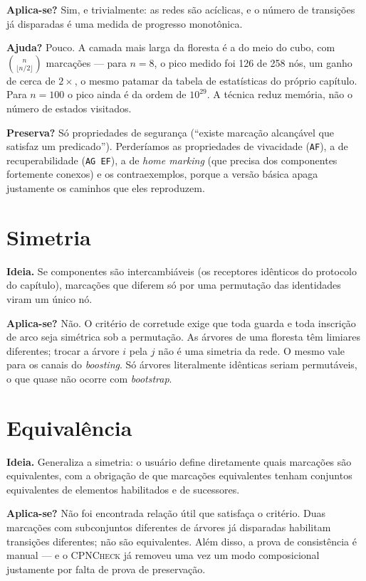 \documentclass[11pt,a4paper]{report}
\newcommand{\cpn}{\textsc{CPNCheck}}
\newcommand{\code}[1]{\texttt{\small #1}}
\theoremstyle{definition}
\begin{document}
\textbf{Aplica-se?} Sim, e trivialmente: as redes são acíclicas, e o número de
transições já disparadas é uma medida de progresso monotônica.

\textbf{Ajuda?} Pouco. A camada mais larga da floresta é a do meio do cubo,
com $\binom{n}{\lfloor n/2\rfloor}$ marcações --- para $n=8$, o pico medido foi
126 de 258 nós, um ganho de cerca de $2\times$, o mesmo patamar da tabela de
estatísticas do próprio capítulo. Para $n=100$ o pico ainda é da ordem de
$10^{29}$. A técnica reduz memória, não o número de estados visitados.

\textbf{Preserva?} Só propriedades de segurança (``existe marcação alcançável
que satisfaz um predicado''). Perderíamos as propriedades de vivacidade
(\code{AF}), a de recuperabilidade (\code{AG EF}), a de \emph{home marking} (que
precisa dos componentes fortemente conexos) e os contraexemplos, porque a
versão básica apaga justamente os caminhos que eles reproduzem.

\section{Simetria}

\textbf{Ideia.} Se componentes são intercambiáveis (os receptores idênticos do
protocolo do capítulo), marcações que diferem só por uma permutação das
identidades viram um único nó.

\textbf{Aplica-se?} Não. O critério de corretude exige que toda guarda e toda
inscrição de arco seja simétrica sob a permutação. As árvores de uma floresta
têm limiares diferentes; trocar a árvore $i$ pela $j$ não é uma simetria da
rede. O mesmo vale para os canais do \emph{boosting}. Só árvores literalmente
idênticas seriam permutáveis, o que quase não ocorre com \emph{bootstrap}.

\section{Equivalência}

\textbf{Ideia.} Generaliza a simetria: o usuário define diretamente quais
marcações são equivalentes, com a obrigação de que marcações equivalentes
tenham conjuntos equivalentes de elementos habilitados e de sucessores.

\textbf{Aplica-se?} Não foi encontrada relação útil que satisfaça o critério.
Duas marcações com subconjuntos diferentes de árvores já disparadas habilitam
transições diferentes; não são equivalentes. Além disso, a prova de
consistência é manual --- e o \cpn{} já removeu uma vez um modo composicional
justamente por falta de prova de preservação.
\end{document}

